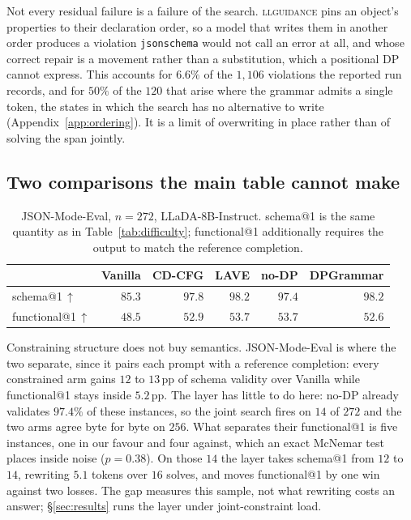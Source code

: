 \documentclass{article}
\begin{document}
Not every residual failure is a failure of the search. \textsc{llguidance} pins
an object's properties to their declaration order, so a model that writes them in
another order produces a violation \texttt{jsonschema} would not call an error at
all, and whose correct repair is a movement rather than a substitution, which a
positional DP cannot express. This accounts for $6.6\%$ of the $1{,}106$
violations the reported run records, and for $50\%$ of the $120$ that arise where
the grammar admits a single token, the states in which the search has no
alternative to write (Appendix~\ref{app:ordering}). It is a limit of overwriting
in place rather than of solving the span jointly.

\subsection{Two comparisons the main table cannot make}
\label{sec:jme}

\begin{table}[h]
\centering
\small
\caption{JSON-Mode-Eval, $n{=}272$, LLaDA-8B-Instruct. schema@1 is the same
quantity as in Table~\ref{tab:difficulty}; functional@1 additionally requires the
output to match the reference completion.}
\label{tab:jme}
\begin{tabular}{lrrrrr}
\toprule
 & Vanilla & CD-CFG & LAVE & no-DP & \textbf{DPGrammar} \\
\midrule
schema@1\,$\uparrow$     & $85.3$ & $97.8$ & $\mathbf{98.2}$ & $97.4$ & $\mathbf{98.2}$ \\
functional@1\,$\uparrow$ & $48.5$ & $52.9$ & $\mathbf{53.7}$ & $\mathbf{53.7}$ & $52.6$ \\
\bottomrule
\end{tabular}
\end{table}

Constraining structure does not buy semantics. JSON-Mode-Eval is where the two
separate, since it pairs each prompt with a reference completion: every constrained arm gains $12$ to $13$\,pp of schema validity over Vanilla
while functional@1 stays inside $5.2$\,pp. The layer has little to do here: no-DP already validates $97.4\%$ of these instances, so the joint search
fires on $14$ of $272$ and the two arms agree byte for byte on $256$. What
separates their functional@1 is five instances, one in our favour and four
against, which an exact McNemar test places inside noise ($p=0.38$).
On those $14$ the layer takes schema@1 from $12$ to $14$, rewriting $5.1$ tokens
over $16$ solves, and moves functional@1 by one win against two losses. The gap measures this sample, not what rewriting costs an answer;
\S\ref{sec:results} runs the layer under joint-constraint load.
\end{document}
